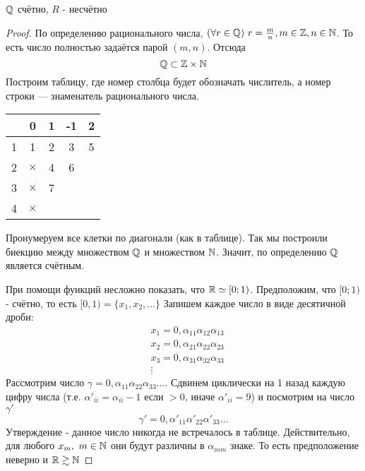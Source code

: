 \begin{proposition}
    $\mathbb{Q}$ счётно, $R$ - несчётно
\end{proposition}

\begin{proof}
    По определению рационального числа, $(\forall r \in \mathbb{Q})\ r = \frac{m}{n}, m \in \mathbb{Z}, n \in \mathbb{N}$. То есть число полностью задаётся парой $(m, n)$. Отсюда
    \[
    	\mathbb{Q} \subset \mathbb{Z} \times \mathbb{N}
    \]
    Построим таблицу, где номер столбца будет обозначать числитель,
    а номер строки --- знаменатель рационального числа. 

    \begin{tabular}{|c|c|c|c|c|}
        \hline
                     & 0 & 1 & -1 & 2\\
        \hline
        1 &        1 & 2 & 3 & 5\\
        \hline
        2 & $\times$ & 4 & 6 & \\
        \hline
        3 & $\times$ & 7 & & \\
        \hline
        4 & $\times$ & & & \\
        \hline
    \end{tabular}

    Пронумеруем все клетки по диагонали (как в таблице). Так мы построили
    биекцию между множеством $\mathbb{Q}$ и множеством $\mathbb{N}$. Значит, по определению
    $\mathbb{Q}$ является счётным.

    При помощи функций несложно показать, что $\mathbb{R} \simeq [0; 1)$. Предположим, что $[0; 1)$ - счётно, то есть $[0, 1) = \{x_1, x_2, \dots\}$
    Запишем каждое число в виде десятичной дроби:
    \begin{align*}
		&{x_1 = 0, \alpha_{11} \alpha_{12} \alpha_{13}}
        \\
        &{x_2 = 0, \alpha_{21} \alpha_{22} \alpha_{23}}
        \\
        &{x_3 = 0, \alpha_{31} \alpha_{32} \alpha_{33}}
        \\
        &\vdots
    \end{align*}
    Рассмотрим число $\gamma = 0,\alpha_{11}\alpha_{22}\alpha_{33}\dots$. Сдвинем циклически на 1 назад каждую цифру числа (т.е. $\alpha'_{ii} = \alpha_{ii} - 1$ если $> 0$, иначе $\alpha'_{ii} = 9$) и посмотрим на число $\gamma'$
    \[
    	\gamma' = 0,\alpha'_{11}\alpha'_{22}\alpha'_{33}\dots
    \]
    Утверждение - данное число никогда не встречалось в таблице.
    Действительно, для любого $x_m,\ m \in \mathbb{N}$ они будут различны 
    в $\alpha_{mm}$ знаке. То есть предположение неверно и
    $\mathbb{R} \gtrsim \mathbb{N}$
\end{proof}

